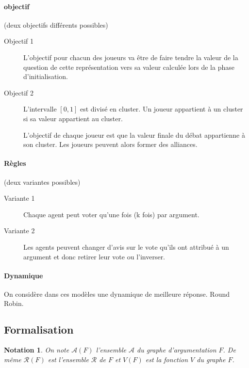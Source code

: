 \documentclass[12pt]{article}
\theoremstyle{defi}
\theoremstyle{not}
\newtheorem{notation}{Notation}[section]
\theoremstyle{prob}
\begin{document}
    \paragraph{objectif}(deux objectifs différents possibles)
      \begin{description}
        \item[Objectif 1] L'objectif pour chacun des joueurs va être de faire tendre la valeur de la question de cette représentation vers sa valeur calculée lors de la phase d'initialisation.
        \item[Objectif 2] L'intervalle $[0, 1]$ est divisé en cluster. Un joueur appartient à un cluster si sa valeur appartient au cluster.

        L'objectif de chaque joueur est que la valeur finale du débat appartienne à son cluster. Les joueurs peuvent alors former des alliances.
      \end{description}


    \paragraph{Règles}(deux variantes possibles)
      \begin{description}
        \item[Variante 1] Chaque agent peut voter qu'une fois (k fois) par argument.

        \item[Variante 2] Les agents peuvent changer d'avis sur le vote qu'ils ont attribué à un argument et donc retirer leur vote ou l'inverser.
      \end{description}

    \paragraph{Dynamique\\}
      On considère dans ces modèles une dynamique de meilleure réponse. Round Robin.

\color{red}
    \subsection{Formalisation}

      \begin{notation}
        On note $\mathcal{A}(F)$ l'ensemble $\mathcal{A}$ du graphe d'argumentation $F$.
        De même $\mathcal{R}(F)$ est l'ensemble $\mathcal{R}$ de $F$ et $V(F)$ est la fonction $V$ du graphe $F$.
      \end{notation}
\end{document}
